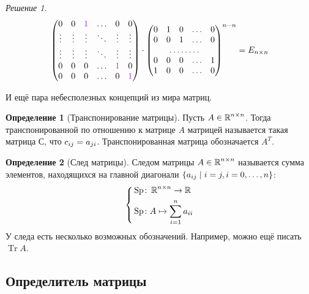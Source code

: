 \documentclass[a4paper,12pt]{article}
\theoremstyle{definition}
\newtheorem{definition}{Определение}[section]
\theoremstyle{remark}
\theoremstyle{remark}
\theoremstyle{remark}
\newtheorem*{solution}{Решение}
\DeclareMathOperator{\Sp}{Sp}
\DeclareMathOperator{\Tr}{Tr}
\begin{document}
\begin{solution}
\begin{equation*}
\begin{split}
\begin{pmatrix}
          0 & 0 & \textcolor{light-purple}{1} & \ldots & 0 & 0\\
          \vdots & \vdots & \vdots & \ddots & \vdots & \vdots\\
          \vdots & \vdots & \vdots & \ddots & \vdots & \vdots\\
          0 & 0 & 0 & \ldots & \textcolor{light-purple}{1} & 0\\
          0 & 0 & 0 & \ldots & 0 & \textcolor{light-purple}{1}
        \end{pmatrix}
        \cdot \begin{pmatrix}
          0 & 1 & 0 & \ldots & 0\\
          0 & 0 & 1 & \ldots & 0\\
          \hdotsfor{5}\\
          0 & 0 & 0 & \ldots & 1\\
          1 & 0 & 0 & \ldots & 0
        \end{pmatrix}^{n-n}
      = E_{n \times n}
    \end{split}
    \end{equation*}
  \end{solution}
  
  И ещё пара небесполезных концепций из мира матриц.
  
  \begin{definition}[Транспонирование матрицы]
    Пусть $A \in \operatorname{\mathbb R}^{n \times n}$.
    Тогда транспонированной по отношению к матрице $A$ матрицей называется такая матрица $С$, что
    $c_{ij} \hm= a_{ji}$.
    Транспонированная матрица обозначается $A^T$.
  \end{definition}
  
  \begin{definition}[След матрицы]
    Следом матрицы $A \in \operatorname{\mathbb R}^{n \times n}$ называется сумма элементов, находящихся на главной диагонали $\{a_{ij} \hm\mid i = j, i = 0, \ldots, n\}$:
    \[
      \left\{
        \begin{aligned}
          &\Sp \colon \RR^{n \times n} \to \RR\\
          &\Sp \colon A \mapsto \sum_{i = 1}^n a_{ii}
        \end{aligned}
      \right.
    \]
    У следа есть несколько возможных обозначений.
    Например, можно ещё писать $\Tr A$.
  \end{definition}


  \subsection{Определитель матрицы}
  
\end{document}
